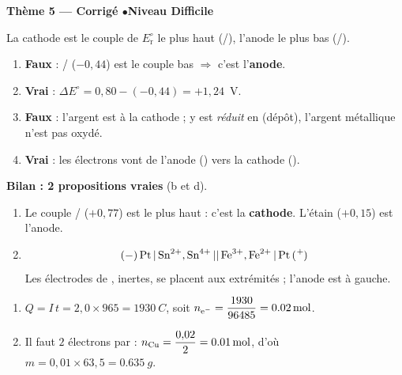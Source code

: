 \documentclass[11pt,a4paper]{article}
\begin{document}
\begin{center}\color{primarydark}\large\bfseries Thème 5 — Corrigé \quad$\bullet$\quad Niveau Difficile\end{center}

\begin{corrige}
La cathode est le couple de $E_{\mathrm{r}}^{\circ}$ le plus haut (/), l'anode le plus
bas (/).
\begin{enumerate}[label=\alph*)]
  \item \textbf{Faux} : / ($-0{,}44$) est le couple bas $\Rightarrow$ c'est
        l'\textbf{anode}.
  \item \textbf{Vrai} : $\Delta E^{\circ}=0{,}80-(-0{,}44)=+1{,}24$~V.
  \item \textbf{Faux} : l'argent est à la cathode ;  y est \emph{réduit} en  (dépôt),
        l'argent métallique n'est pas oxydé.
  \item \textbf{Vrai} : les électrons vont de l'anode () vers la cathode ().
\end{enumerate}
\textbf{Bilan : 2 propositions vraies} (b et d).
\end{corrige}

\begin{corrige}
\begin{enumerate}[label=\alph*)]
  \item Le couple / ($+0{,}77$) est le plus haut : c'est la \textbf{cathode}.
        L'étain ($+0{,}15$) est l'anode.
  \item \[\ce{(-) Pt | Sn^{2+}, Sn^{4+} || Fe^{3+}, Fe^{2+} | Pt (+)}\]
        Les électrodes de , inertes, se placent aux extrémités ; l'anode est à gauche.
\end{enumerate}
\end{corrige}

\begin{corrige}
\begin{enumerate}[label=\alph*)]
  \item $Q=I\,t=2{,}0\times 965=\qty{1930}{C}$, soit $n_{\ce{e^-}}=\dfrac{1930}{96485}=\qty{0.02}{mol}$.
  \item Il faut $2$ électrons par  : $n_{\ce{Cu}}=\dfrac{0{,}02}{2}=\qty{0.01}{mol}$, d'où
        $m=0{,}01\times 63{,}5=\qty{0.635}{g}$.
\end{enumerate}
\end{corrige}
\end{document}
